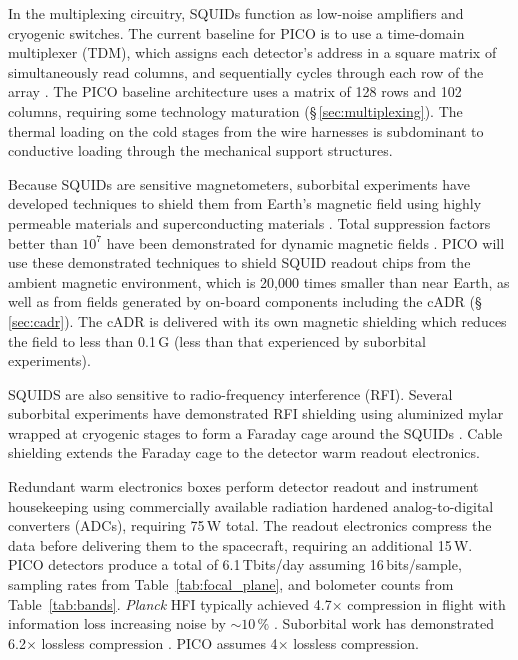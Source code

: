 In the multiplexing circuitry, SQUIDs function as
low-noise amplifiers and cryogenic switches. The current baseline for
PICO is to use a time-domain multiplexer (TDM), which assigns each
detector's address in a square matrix of simultaneously read columns,
and sequentially cycles through each row of the array
\citep{Henderson2016}. The PICO baseline architecture uses a matrix of
128 rows and 102 columns, requiring some technology maturation
(\S\,\ref{sec:multiplexing}). The thermal loading on
the cold stages from the wire harnesses is subdominant to conductive
loading through the mechanical support structures.  

Because SQUIDs are sensitive magnetometers, suborbital experiments
have developed techniques to shield them from Earth's magnetic field
using highly permeable materials and superconducting materials
\citep{Hui2018}.  Total suppression factors better than $10^7$ have
been demonstrated for dynamic magnetic fields \citep{Runyan2010}. PICO
will use these demonstrated techniques to shield SQUID readout chips
from the ambient magnetic environment, which is 20,000 times smaller
than near Earth, as well as from fields generated by on-board
components including the cADR (\S\,\ref{sec:cadr}). The cADR is
delivered with its own magnetic shielding which reduces the field to
less than 0.1\,G (less than that experienced by suborbital
experiments).

SQUIDS are also sensitive to radio-frequency interference
(RFI). Several suborbital experiments have demonstrated RFI shielding
using aluminized mylar wrapped at cryogenic stages to form a Faraday
cage around the SQUIDs \citep{Kermish2012,EBEX2018,BICEP2014}.
 Cable shielding extends the Faraday cage to
the detector warm readout electronics.

Redundant warm electronics boxes perform detector readout and
instrument housekeeping using commercially available radiation
hardened analog-to-digital converters (ADCs), requiring 75\,W total.
The readout electronics compress the data before delivering them to
the spacecraft, requiring an additional 15\,W. PICO detectors produce
a total of 6.1\,Tbits/day assuming 16\,bits/sample, sampling rates
from Table~\ref{tab:focal_plane}, and bolometer counts from
Table~\ref{tab:bands}. \textit{Planck} HFI typically achieved
4.7$\times$ compression in flight with information loss increasing
noise by $\sim10\,\%$ \citep{Pajot2018,PlanckHFI2011}. Suborbital work
has demonstrated 6.2$\times$ lossless compression
\citep{EBEX2017}. PICO assumes 4$\times$ lossless compression.

